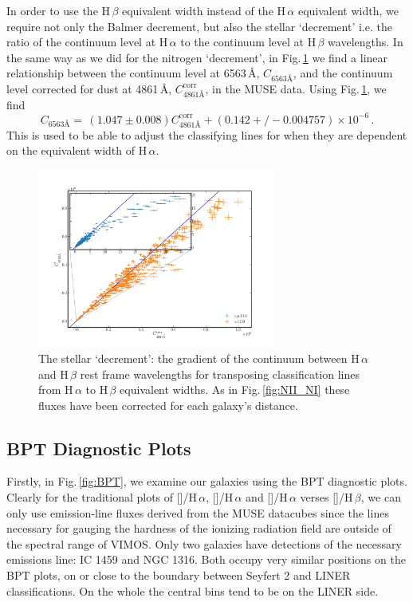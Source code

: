 		In order to use the H\,$\beta$ equivalent width instead of the H\,$\alpha$ equivalent width, we require not only the Balmer decrement, but also the stellar `decrement' i.e. the ratio of the continuum level at H\,$\alpha$ to the continuum level at H\,$\beta$ wavelengths. In the same way as we did for the nitrogen `decrement', in Fig.\,\ref{fig:stellarDec} we find a linear relationship between the continuum level at 6563\,\AA, $C_\text{6563\AA}$, and the continuum level corrected for dust at 4861\,\AA, $C^\text{corr}_\text{4861\AA}$, in the MUSE data. Using Fig.\,\ref{fig:stellarDec}, we find
		\begin{equation}
			C_\text{6563\AA} = \, (1.047\pm0.008) C^\text{corr}_\text{4861\AA} + (0.142+/-0.004757) \times 10^{-6} \, .
		\end{equation}
		This is used to be able to adjust the classifying lines for when they are dependent on the equivalent width of H\,$\alpha$. 

		\begin{figure}
			\centering
			\includegraphics[width=0.7\textwidth]{chapter5/stellar_ratio.png}
			\caption[The stellar `decrement']{The stellar `decrement': the gradient of the continuum between H\,$\alpha$ and H\,$\beta$ rest frame wavelengths for transposing classification lines from H\,$\alpha$ to H\,$\beta$ equivalent widths. As in Fig.\,\ref{fig:NII_NI} these fluxes have been corrected for each galaxy's distance.} 
			\label{fig:stellarDec}
		\end{figure}

	\subsection{BPT Diagnostic Plots}
		\label{subsec:BPT}
		Firstly, in Fig.\,\ref{fig:BPT}, we examine our galaxies using the BPT diagnostic plots. Clearly for the traditional plots of []/H\,$\alpha$, []/H\,$\alpha$ and []/H\,$\alpha$ verses []/H\,$\beta$, we can only use emission-line fluxes derived from the MUSE datacubes since the lines necessary for gauging the hardness of the ionizing radiation field are outside of the spectral range of VIMOS. Only two galaxies have detections of the necessary emissions line: IC 1459 and NGC 1316. Both occupy very similar positions on the BPT plots, on or close to the boundary between Seyfert 2 and LINER classifications. On the whole the central bins tend to be on the LINER side.

